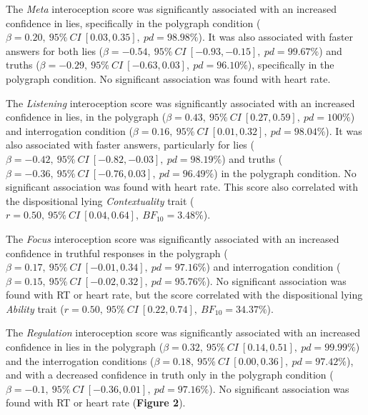 \documentclass[
  man,floatsintext]{apa6}
\begin{document}
The \emph{Meta} interoception score was significantly associated with an increased confidence in lies, specifically in the polygraph condition (\(\beta=0.20,~95\%~CI~[0.03, 0.35],~pd = 98.98\%\)). It was also associated with faster answers for both lies (\(\beta=-0.54,~95\%~CI~[-0.93, -0.15],~pd = 99.67\%\)) and truths (\(\beta=-0.29,~95\%~CI~[-0.63, 0.03],~pd = 96.10\%\)), specifically in the polygraph condition. No significant association was found with heart rate.

The \emph{Listening} interoception score was significantly associated with an increased confidence in lies, in the polygraph (\(\beta=0.43,~95\%~CI~[0.27, 0.59],~pd = 100\%\)) and interrogation condition (\(\beta=0.16,~95\%~CI~[0.01, 0.32],~pd = 98.04\%\)). It was also associated with faster answers, particularly for lies (\(\beta=-0.42,~95\%~CI~[-0.82, -0.03],~pd = 98.19\%\)) and truths (\(\beta=-0.36,~95\%~CI~[-0.76, 0.03],~pd = 96.49\%\)) in the polygraph condition. No significant association was found with heart rate. This score also correlated with the dispositional lying \emph{Contextuality} trait (\(r = 0.50,~95\%~CI~[0.04, 0.64],~BF_{10} = 3.48\%\)).

The \emph{Focus} interoception score was significantly associated with an increased confidence in truthful responses in the polygraph (\(\beta=0.17,~95\%~CI~[-0.01, 0.34],~pd = 97.16\%\)) and interrogation condition (\(\beta=0.15,~95\%~CI~[-0.02, 0.32],~pd = 95.76\%\)). No significant association was found with RT or heart rate, but the score correlated with the dispositional lying \emph{Ability} trait (\(r = 0.50,~95\%~CI~[0.22, 0.74],~BF_{10} = 34.37\%\)).

The \emph{Regulation} interoception score was significantly associated with an increased confidence in lies in the polygraph (\(\beta=0.32,~95\%~CI~[0.14, 0.51],~pd = 99.99\%\)) and the interrogation conditions (\(\beta=0.18,~95\%~CI~[0.00, 0.36],~pd = 97.42\%\)), and with a decreased confidence in truth only in the polygraph condition (\(\beta=-0.1,~95\%~CI~[-0.36, 0.01],~pd = 97.16\%\)). No significant association was found with RT or heart rate (\textbf{Figure 2}).
\end{document}
